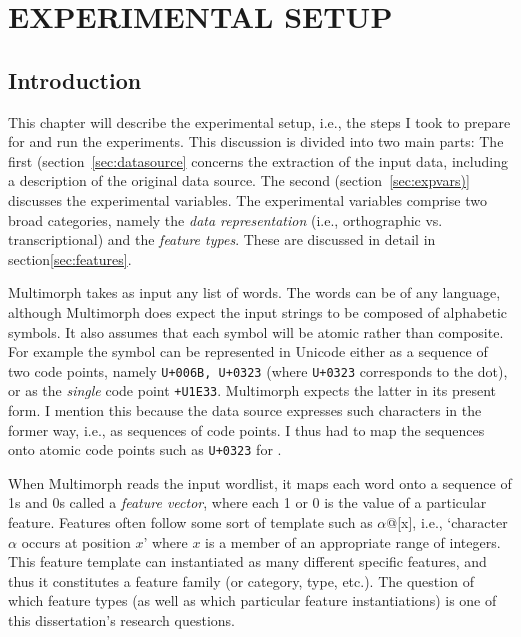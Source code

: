 \chapter{EXPERIMENTAL SETUP}

\section{Introduction}
This chapter will describe the experimental setup, i.e., the steps I took to prepare for and run the experiments. This discussion
is divided into two main parts: The first (section~\ref{sec:datasource} concerns the extraction of the input data, including a description of the original data source. The second (section~\ref{sec:expvars)} discusses the experimental variables. The experimental variables comprise two broad categories, namely the \emph{data representation} (i.e., orthographic vs. transcriptional) and the \emph{feature types}. These are discussed in detail in section\ref{sec:features}. 


Multimorph takes as input any list of words. The words can be of any
language, although Multimorph does expect the input strings to be composed
of alphabetic symbols. It also assumes that each symbol will be atomic rather 
than composite. 
For example the symbol \textsf{} can be represented in Unicode either 
as a sequence of two code points, namely \texttt{U+006B, U+0323} 
(where \texttt{U+0323}
corresponds to the dot), or as the \emph{single} code point \texttt{+U1E33}. 
Multimorph 
expects the latter in its present form. I mention this because the data source 
expresses
such characters in the former way, i.e., as sequences of code points. I thus had
to map the sequences onto atomic code points such as \texttt{U+0323} 
for \textsf{}.

When Multimorph reads the input wordlist, 
it maps each word onto
a sequence of 1s and 0s called a \emph{feature vector}, 
where each 1 or 0 is the value of a
particular feature. 
Features often follow some sort of template such as $\alpha$@[x], i.e., `character $\alpha$ occurs at position $x$' where $x$ is a member of an appropriate range of integers. This feature template can instantiated as many different specific features, and thus it constitutes a feature family (or category, type, etc.). The question of which feature types (as well as which particular feature instantiations) is one of this dissertation's research questions. 

